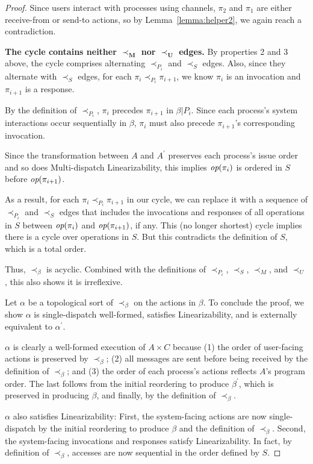 \begin{proof}
  Since users interact with processes using channels, $\pi_2$ and $\pi_1$ are either receive-from or send-to actions, so by Lemma~\ref{lemma:helper2}, we again reach a contradiction.

  \noindent \textbf{The cycle contains neither $\mathbf{\prec_M}$ nor $\mathbf{\prec_U}$ edges.}
  By properties 2 and 3 above, the cycle comprises alternating $\prec_{P_i}$ and $\prec_S$ edges. Also, since they alternate with $\prec_S$ edges, for each $\pi_i \prec_{P_i} \pi_{i+1}$, we know $\pi_i$ is an invocation and $\pi_{i+1}$ is a response.

  By the definition of $\prec_{P_i}$, $\pi_i$ precedes $\pi_{i+1}$ in $\beta | P_i$. Since each process’s system interactions occur sequentially in $\beta$, $\pi_i$ must also precede $\pi_{i+1}$'s corresponding invocation.

  Since the transformation between $A$ and $A^\prime$ preserves each process’s issue order and so does Multi-dispatch Linearizability, this implies $\operatorname*{\textit{op}}(\pi_i)$ is ordered in $S$ before $\operatorname*{\textit{op}}(\pi_{i+1})$.

  As a result, for each $\pi_i \prec_{P_i} \pi_{i+1}$ in our cycle, we can replace it with a sequence of $\prec_{P_i}$ and $\prec_S$ edges that includes the invocations and responses of all operations in $S$ between $\operatorname*{\textit{op}}(\pi_i)$ and $\operatorname*{\textit{op}}(\pi_{i+1})$, if any. This (no longer shortest) cycle implies there is a cycle over operations in $S$. But this contradicts the definition of $S$, which is a total order.

  Thus, $\prec_\beta$ is acyclic. Combined with the definitions of $\prec_{P_i}$, $\prec_S$, $\prec_M$, and $\prec_U$, this also shows it is irreflexive.

  Let $\alpha$ be a topological sort of $\prec_\beta$ on the actions in $\beta$. To conclude the proof, we show $\alpha$ is single-dispatch well-formed, satisfies Linearizability, and is externally equivalent to $\alpha^\prime$.

  $\alpha$ is clearly a well-formed execution of $A \times C$ because
  (1) the order of user-facing actions is preserved by $\prec_\beta$;
  (2) all messages are sent before being received by the definition of $\prec_\beta$; and
  (3) the order of each process’s actions reflects $A$’s program order.
  The last follows from the initial reordering to produce $\beta^\prime$, which is preserved in producing $\beta$, and finally, by the definition of $\prec_\beta$.

  $\alpha$ also satisfies Linearizability:
  First, the system-facing actions are now single-dispatch by the initial reordering to produce $\beta$ and the definition of $\prec_\beta$.
  Second, the system-facing invocations and responses satisfy Linearizability. In fact, by definition of $\prec_\beta$, accesses are now sequential in the order defined by $S$.


\end{proof}
